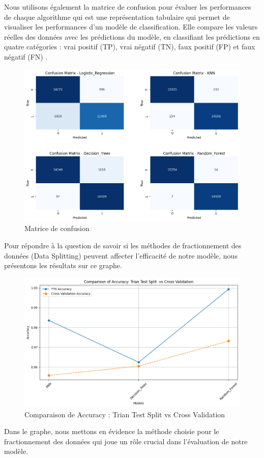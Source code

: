\documentclass[a4paper,12pt]{report}
\begin{document}
\noindent \normalsize Nous utilisons également la matrice de confusion pour évaluer les performances de chaque algorithme qui est une représentation tabulaire qui permet de visualiser les performances d'un modèle de classification. Elle compare les valeurs réelles des données avec les prédictions du modèle, en classifiant les prédictions en quatre catégories : vrai positif (TP), vrai négatif (TN), faux positif (FP) et faux négatif (FN) .
\begin{figure}[H]
\centering
 \includegraphics[scale=0.6]{outils-images/graphs/g6.png}
\caption{Matrice de confusion}
\end{figure}

\noindent \normalsize Pour répondre à la question de savoir si les méthodes de fractionnement des données (Data Splitting) peuvent affecter l’efficacité de notre modèle, nous présentons les résultats sur ce graphe.
\begin{figure}[H]
\centering
 \includegraphics[scale=0.6]{outils-images/graphs/g7.png}
\caption{Comparaison de Accuracy : Trian Test Split  vs Cross Validation}
\end{figure}
\noindent \normalsize Dans le graphe, nous mettons en évidence la méthode choisie pour le fractionnement des données qui joue un rôle crucial dans l'évaluation de notre modèle.
\end{document}
